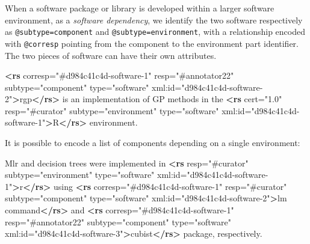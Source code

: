 \documentclass[
]{article}
\newenvironment{Shaded}{}{}
\newcommand{\KeywordTok}[1]{\textcolor[rgb]{0.00,0.44,0.13}{\textbf{#1}}}
\newcommand{\NormalTok}[1]{#1}
\newcommand{\OtherTok}[1]{\textcolor[rgb]{0.00,0.44,0.13}{#1}}
\newcommand{\StringTok}[1]{\textcolor[rgb]{0.25,0.44,0.63}{#1}}
\begin{document}
When a software package or library is developed within a larger software
environment, as a \emph{software dependency}, we identify the two
software respectively as \texttt{@subtype=component} and
\texttt{@subtype=environment}, with a relationship encoded with
\texttt{@corresp} pointing from the component to the environment part
identifier. The two pieces of software can have their own attributes.

\begin{Shaded}
\begin{Highlighting}[]
\KeywordTok{\textless{}rs}\OtherTok{ corresp=}\StringTok{"\#d984c41c4d{-}software{-}1"}\OtherTok{ resp=}\StringTok{"\#annotator22"}\OtherTok{ subtype=}\StringTok{"component"} 
\OtherTok{  type=}\StringTok{"software"}\OtherTok{ xml:id=}\StringTok{"d984c41c4d{-}software{-}2"}\KeywordTok{\textgreater{}}\NormalTok{rgp}\KeywordTok{\textless{}/rs\textgreater{}}\NormalTok{ is an implementation }
\NormalTok{of GP methods in the }\KeywordTok{\textless{}rs}\OtherTok{ cert=}\StringTok{"1.0"}\OtherTok{ resp=}\StringTok{"\#curator"}\OtherTok{ subtype=}\StringTok{"environment"} 
\OtherTok{  type=}\StringTok{"software"}\OtherTok{ xml:id=}\StringTok{"d984c41c4d{-}software{-}1"}\KeywordTok{\textgreater{}}\NormalTok{R}\KeywordTok{\textless{}/rs\textgreater{}}\NormalTok{ environment. }
\end{Highlighting}
\end{Shaded}

It is possible to encode a list of components depending on a single
environment:

\begin{Shaded}
\begin{Highlighting}[]
\NormalTok{Mlr and decision trees were implemented in }\KeywordTok{\textless{}rs}\OtherTok{ resp=}\StringTok{"\#curator"}\OtherTok{ subtype=}\StringTok{"environment"} 
\OtherTok{type=}\StringTok{"software"}\OtherTok{ xml:id=}\StringTok{"d984c41c4d{-}software{-}1"}\KeywordTok{\textgreater{}}\NormalTok{r}\KeywordTok{\textless{}/rs\textgreater{}}\NormalTok{ using }
\KeywordTok{\textless{}rs}\OtherTok{ corresp=}\StringTok{"\#d984c41c4d{-}software{-}1"}\OtherTok{ resp=}\StringTok{"\#curator"}\OtherTok{ subtype=}\StringTok{"component"} 
\OtherTok{  type=}\StringTok{"software"}\OtherTok{ xml:id=}\StringTok{"d984c41c4d{-}software{-}2"}\KeywordTok{\textgreater{}}\NormalTok{lm command}\KeywordTok{\textless{}/rs\textgreater{}}\NormalTok{ and }
\KeywordTok{\textless{}rs}\OtherTok{ corresp=}\StringTok{"\#d984c41c4d{-}software{-}1"}\OtherTok{ resp=}\StringTok{"\#annotator22"}\OtherTok{ subtype=}\StringTok{"component"} 
\OtherTok{    type=}\StringTok{"software"}\OtherTok{ xml:id=}\StringTok{"d984c41c4d{-}software{-}3"}\KeywordTok{\textgreater{}}\NormalTok{cubist}\KeywordTok{\textless{}/rs\textgreater{}}\NormalTok{ package, respectively. }
\end{Highlighting}
\end{Shaded}
\end{document}
